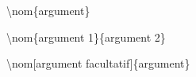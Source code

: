 \documentclass[12pt]{article}
\begin{document}
\noindent\huge{\textbackslash \textcolor{rouge}{\textcolor{rouge}{nom}}\{\textcolor{bleu}{argument}\}}

\noindent\huge{\textbackslash \textcolor{rouge}{nom}\{\textcolor{bleu}{argument 1}\}\{\textcolor{bleu}{argument 2}\}}

\noindent\huge{\textbackslash \textcolor{rouge}{nom}[\textcolor{gris}{argument facultatif}]\{\textcolor{bleu}{argument}\}}
\end{document}
